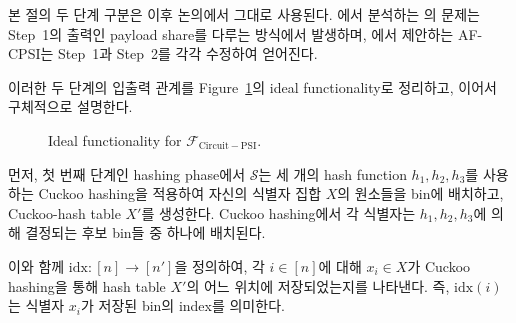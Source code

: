 \documentclass[sigconf,anonymous,review]{acmart}
\begin{document}
본 절의 두 단계 구분은 이후 논의에서 그대로 사용된다.
에서 분석하는 \cite{LTS+26}의 문제는 Step~1의
출력인 payload share를 다루는 방식에서 발생하며,
에서 제안하는 AF-CPSI는 Step~1과 Step~2를 각각
수정하여 얻어진다.

이러한 두 단계의 입출력 관계를
Figure~\ref{fig:cpsi-ideal-functionality}의 ideal functionality로 정리하고, 이어서 구체적으로 설명한다.

\begin{figure}[h]
\centering
{}
\caption{Ideal functionality for $\mathcal{F}_{\mathrm{Circuit-PSI}}$.}
\label{fig:cpsi-ideal-functionality}
\end{figure}


먼저, 첫 번째 단계인 hashing phase에서 $\mathcal{S}$는 세 개의
hash function $h_1,h_2,h_3$를 사용하는 Cuckoo hashing을 적용하여
자신의 식별자 집합 $X$의 원소들을 bin에 배치하고,
Cuckoo-hash table $X'$를 생성한다.
Cuckoo hashing에서 각 식별자는 $h_1,h_2,h_3$에 의해 결정되는
후보 bin들 중 하나에 배치된다.

이와 함께 $\mathrm{idx}:[n]\rightarrow[n']$을 정의하여,
각 $i\in[n]$에 대해 $x_i\in X$가 Cuckoo hashing을 통해
hash table $X'$의 어느 위치에 저장되었는지를 나타낸다.
즉, $\mathrm{idx}(i)$는 식별자 $x_i$가 저장된 bin의 index를 의미한다.
\end{document}
